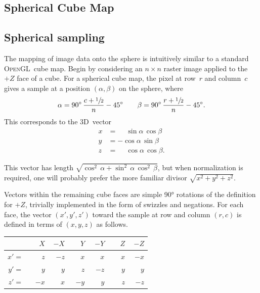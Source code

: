 \documentclass[oneside,10pt]{memoir}
\newcommand{\threed}  {3D}
\newcommand{\opengl}  {\textsc{OpenGL}}
\newcommand{\B}{\bigstrut[b]}
\newcommand{\T}{\bigstrut[t]}
\newcommand{\Pos}[1]{\phantom{-}{#1}}
\newcommand{\Neg}[1]{        {-}{#1}}
\begin{document}


\begin{Spacing}{1.1}




\tableofcontents


\chapter{Spherical Cube Map}

\section{Spherical sampling}
\label{sec:sampling}

The mapping of image data onto the sphere is intuitively similar to a standard \opengl\ cube map. Begin by considering an $n\times n$ raster image applied to the $+Z$ face of a cube. For a spherical cube map, the pixel at row~$r$ and column~$c$ gives a sample at a position $(\alpha, \beta)$ on the sphere, where
\[\alpha=90^{\circ}\,\frac{c + \sfrac{1}{2}}{n} - 45^{\circ}\qquad\beta=90^{\circ}\,\frac{r + \sfrac{1}{2}}{n} - 45^{\circ}.\]
This corresponds to the \threed\ vector
\begin{align*}
x& = \phantom{-}\sin\alpha\, \cos\beta\\
y& =         {-}\cos\alpha\, \sin\beta\\
z& = \phantom{-}\cos\alpha\, \cos\beta.
\end{align*}

This vector has length \(\sqrt{\cos^2\,\alpha + \sin^2\,\alpha\,\cos^2\,\beta}\), but when normalization is required, one will probably prefer the more familiar divisor \(\sqrt{x^2+y^2+z^2}\).

Vectors within the remaining cube faces are simple \ang{90} rotations of the definition for $+Z$, trivially implemented in the form of swizzles and negations. For each face, the vector $(x', y', z')$ toward the sample at row and column $(r, c)$ is defined in terms of $(x, y, z)$ as follows.
\begin{center}
\begin{tabular}{rr|r|r|r|r|r}
    &$\Pos{X}$&$\Neg{X}$&$\Pos{Y}$&$\Neg{Y}$&$\Pos{Z}$&$\Neg{Z}$\B\\\hline
$x'=$&$\Pos{z}$&$\Neg{z}$&$\Pos{x}$&$\Pos{x}$&$\Pos{x}$&$\Neg{x}$\T\\
$y'=$&$\Pos{y}$&$\Pos{y}$&$\Pos{z}$&$\Neg{z}$&$\Pos{y}$&$\Pos{y}$\\
$z'=$&$\Neg{x}$&$\Pos{x}$&$\Neg{y}$&$\Pos{y}$&$\Pos{z}$&$\Neg{z}$\\
\end{tabular}
\end{center}


\end{Spacing}
\end{document}
